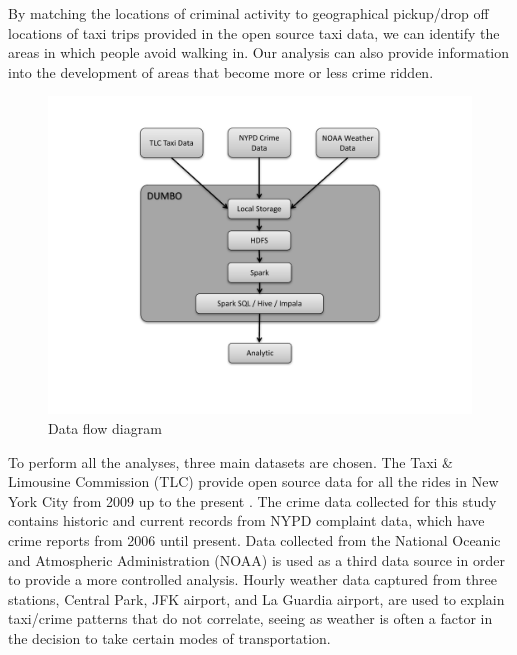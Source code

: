 \documentclass{sigkddExp}
\begin{document}




By matching the locations of criminal activity to geographical pickup/drop off locations of taxi trips provided in the open source taxi data, we can identify the areas in which people avoid walking in. Our analysis can also provide information into the development of areas that become more or less crime ridden. 

\begin{figure}
\caption{Data flow diagram}
\label{figx}
\centering \includegraphics[width=.45\textwidth]{images/DesignFlowDiagram.pdf}
\end{figure}

To perform all the analyses, three main datasets are chosen.
The Taxi \& Limousine Commission (TLC) provide open source data for all the rides in New York City from 2009 up to the present \cite{Taxi}. 
The crime data collected for this study contains historic \cite{NYPDHis} and current \cite{NYPDCur} records from NYPD complaint data, which have crime reports from 2006 until present.
Data collected from the National Oceanic and Atmospheric Administration (NOAA) \cite{NOAA} is used as a third data source in order to provide a more controlled analysis. Hourly weather data captured from three stations, Central Park, JFK airport, and La Guardia airport, are used to explain taxi/crime patterns that do not correlate, seeing as weather is often a factor in the decision to take certain modes of transportation.
\end{document}
